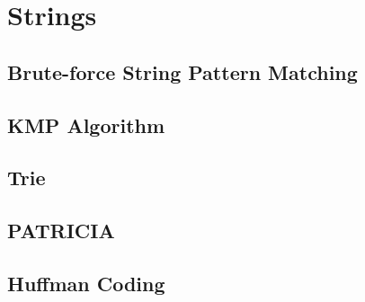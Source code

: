 \documentclass{report}
\begin{document}

\chapter{Strings}

\section{Brute-force String Pattern Matching}

\section{KMP Algorithm}

\section{Trie}

\section{PATRICIA}

\section{Huffman Coding}
\end{document}
